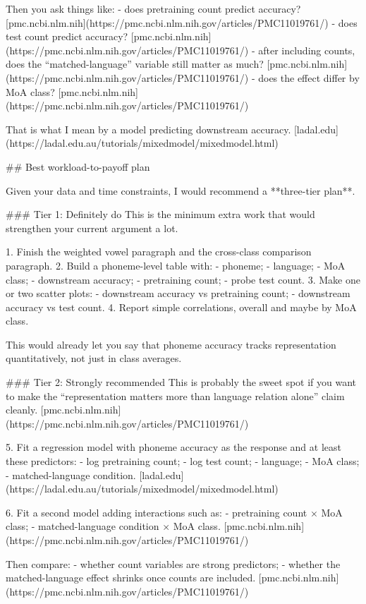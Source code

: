 Then you ask things like:
- does pretraining count predict accuracy? [pmc.ncbi.nlm.nih](https://pmc.ncbi.nlm.nih.gov/articles/PMC11019761/)
- does test count predict accuracy? [pmc.ncbi.nlm.nih](https://pmc.ncbi.nlm.nih.gov/articles/PMC11019761/)
- after including counts, does the “matched-language” variable still matter as much? [pmc.ncbi.nlm.nih](https://pmc.ncbi.nlm.nih.gov/articles/PMC11019761/)
- does the effect differ by MoA class? [pmc.ncbi.nlm.nih](https://pmc.ncbi.nlm.nih.gov/articles/PMC11019761/)

That is what I mean by a model predicting downstream accuracy. [ladal.edu](https://ladal.edu.au/tutorials/mixedmodel/mixedmodel.html)

## Best workload-to-payoff plan

Given your data and time constraints, I would recommend a **three-tier plan**.

### Tier 1: Definitely do
This is the minimum extra work that would strengthen your current argument a lot.

1. Finish the weighted vowel paragraph and the cross-class comparison paragraph.
2. Build a phoneme-level table with:
- phoneme;
- language;
- MoA class;
- downstream accuracy;
- pretraining count;
- probe test count.
3. Make one or two scatter plots:
- downstream accuracy vs pretraining count;
- downstream accuracy vs test count.
4. Report simple correlations, overall and maybe by MoA class.

This would already let you say that phoneme accuracy tracks representation quantitatively, not just in class averages.

### Tier 2: Strongly recommended
This is probably the sweet spot if you want to make the “representation matters more than language relation alone” claim cleanly. [pmc.ncbi.nlm.nih](https://pmc.ncbi.nlm.nih.gov/articles/PMC11019761/)

5. Fit a regression model with phoneme accuracy as the response and at least these predictors:
- log pretraining count;
- log test count;
- language;
- MoA class;
- matched-language condition. [ladal.edu](https://ladal.edu.au/tutorials/mixedmodel/mixedmodel.html)

6. Fit a second model adding interactions such as:
- pretraining count × MoA class;
- matched-language condition × MoA class. [pmc.ncbi.nlm.nih](https://pmc.ncbi.nlm.nih.gov/articles/PMC11019761/)

Then compare:
- whether count variables are strong predictors;
- whether the matched-language effect shrinks once counts are included. [pmc.ncbi.nlm.nih](https://pmc.ncbi.nlm.nih.gov/articles/PMC11019761/)

